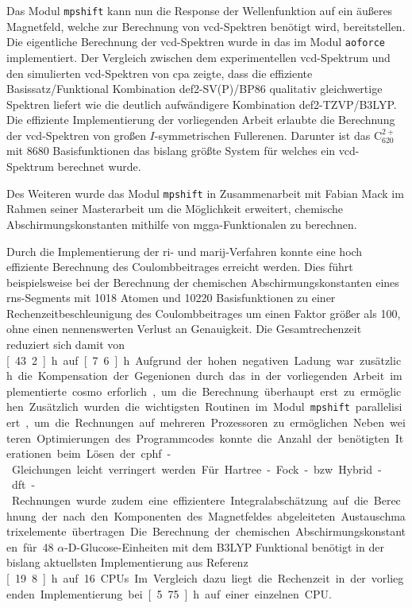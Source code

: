 Das Modul \texttt{mpshift} kann nun die Response der Wellenfunktion auf ein äußeres Magnetfeld, welche zur Berechnung von \ac{vcd}-Spektren benötigt wird, bereitstellen. Die eigentliche Berechnung der \ac{vcd}-Spektren wurde in das im Modul \texttt{aoforce} implementiert. Der Vergleich zwischen dem experimentellen \ac{vcd}-Spektrum und den simulierten \ac{vcd}-Spektren von \acl{cpa} zeigte, dass die effiziente Basissatz/Funktional Kombination def2-SV(P)/BP86 qualitativ gleichwertige Spektren liefert wie die deutlich aufwändigere Kombination def2-TZVP/B3LYP. Die effiziente Implementierung der vorliegenden Arbeit erlaubte die Berechnung der \ac{vcd}-Spektren von großen $I$-symmetrischen Fullerenen. Darunter ist das C$_{620}^{2+}$ mit 8680 Basisfunktionen das bislang größte System für welches ein \ac{vcd}-Spektrum berechnet wurde.

Des Weiteren wurde das Modul \texttt{mpshift} in Zusammenarbeit mit Fabian Mack im Rahmen seiner Masterarbeit um die Möglichkeit erweitert, chemische Abschirmungskonstanten mithilfe von \ac{mgga}-Funktionalen zu berechnen. 

\bigskip
Durch die Implementierung der \ac{ri}- und \ac{marij}-Verfahren konnte eine hoch effiziente Berechnung des Coulombbeitrages erreicht werden. Dies führt beispielsweise bei der Berechnung der chemischen Abschirmungskonstanten eines \ac{rns}-Segments mit 1018 Atomen und 10220 Basisfunktionen zu einer Rechenzeitbeschleunigung des Coulombbeitrages um einen Faktor größer als 100, ohne einen nennenswerten Verlust an Genauigkeit. Die Gesamtrechenzeit reduziert sich damit von \unit[43.2]{h} auf \unit[7.6]{h}. Aufgrund der hohen negativen Ladung war zusätzlich die Kompensation der Gegenionen durch das in der vorliegenden Arbeit implementierte \ac{cosmo} erforlich, um die Berechnung überhaupt erst zu ermöglichen. Zusätzlich wurden die wichtigsten Routinen im Modul \texttt{mpshift} parallelisiert, um die Rechnungen auf mehreren Prozessoren zu ermöglichen. Neben weiteren Optimierungen des Programmcodes konnte die Anzahl der benötigten Iterationen beim Lösen der \ac{cphf}-Gleichungen leicht verringert werden. Für Hartree-Fock- bzw. Hybrid-\ac{dft}-Rechnungen wurde zudem eine effizientere Integralabschätzung auf die Berechnung der nach den Komponenten des Magnetfeldes abgeleiteten Austauschmatrixelemente übertragen. Die Berechnung der chemischen Abschirmungskonstanten für 48 $\alpha$-D-Glucose-Einheiten mit dem B3LYP Funktional benötigt in der bislang aktuellsten Implementierung aus Referenz \cite{kumar2016nuclei}  \unit[19.8]{h} auf 16 CPUs. Im Vergleich dazu liegt die Rechenzeit in der vorliegenden Implementierung bei \unit[5.75]{h} auf einer einzelnen CPU.

